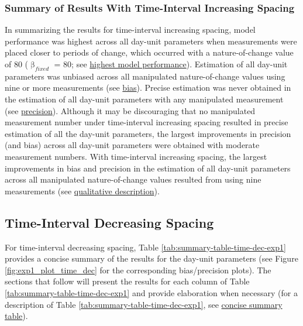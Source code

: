 \documentclass[
12pt, %
twoside,
english]{guelphthesis}
\begin{document}
\hypertarget{summary-of-results-with-time-interval-increasing-spacing}{%
\subsubsection{Summary of Results With Time-Interval Increasing Spacing}\label{summary-of-results-with-time-interval-increasing-spacing}}

In summarizing the results for time-interval increasing spacing, model performance was highest across all day-unit parameters when measurements were placed closer to periods of change, which occurred with a nature-of-change value of 80 (\(\upbeta_{fixed}\) = 80; see \protect\hyperlink{nature-change-time-inc-exp1}{highest model performance}). Estimation of all day-unit parameters was unbiased across all manipulated nature-of-change values using nine or more measurements (see \protect\hyperlink{bias-time-inc-exp1}{bias}). Precise estimation was never obtained in the estimation of all day-unit parameters with any manipulated measurement (see \protect\hyperlink{precision-time-inc-exp1}{precision}). Although it may be discouraging that no manipulated measurement number under time-interval increasing spacing resulted in precise estimation of all the day-unit parameters, the largest improvements in precision (and bias) across all day-unit parameters were obtained with moderate measurement numbers. With time-interval increasing spacing, the largest improvements in bias and precision in the estimation of all day-unit parameters across all manipulated nature-of-change values resulted from using nine measurements (see \protect\hyperlink{qualitative-time-inc-exp1}{qualitative description}).

\hypertarget{time-interval-decreasing-spacing}{%
\subsection{Time-Interval Decreasing Spacing}\label{time-interval-decreasing-spacing}}

For time-interval decreasing spacing, Table \ref{tab:summary-table-time-dec-exp1} provides a concise summary of the results for the day-unit parameters (see Figure \ref{fig:exp1_plot_time_dec} for the corresponding bias/precision plots). The sections that follow will present the results for each column of Table \ref{tab:summary-table-time-dec-exp1} and provide elaboration when necessary (for a description of Table \ref{tab:summary-table-time-dec-exp1}, see \protect\hyperlink{concise-tab}{concise summary table}).
\end{document}
